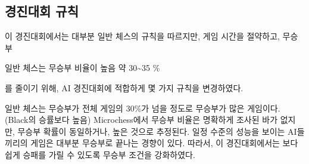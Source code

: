 \documentclass[letterpaper,10pt,english]{sphinxmanual}
\begin{document}
\subsection{경진대회 규칙}
\label{\detokenize{01-microchess_ai_competition:id1}}
이 경진대회에서는 대부분 일반 체스의 규칙을 따르지만, 게임 시간을 절약하고, 무승부 %
\begin{footnote}[1]\sphinxAtStartFootnote
일반 체스는 무승부 비율이 높음 약 30\textasciitilde{}35 \%
%
\end{footnote} 를 줄이기 위해,
AI 경진대회에 적합하게 몇 가지 규칙을 변경하였다.

일반 체스는 무승부가 전체 게임의 30\%가 넘을 정도로 무승부가 많은 게임이다. (Black의 승률보다 높음)
Microchess에서 무승부 비율은 명확하게 조사된 바가 없지만, 무승부 확률이 동일하거나, 높은 것으로 추정된다.
일정 수준의 성능을 보이는 AI들끼리의 게임은 대부분 무승부로 끝나는 경향이 있다.
따라서, 이 경진대회에서는 보다 쉽게 승패를 가릴 수 있도록 무승부 조건을 강화하였다.
\end{document}
